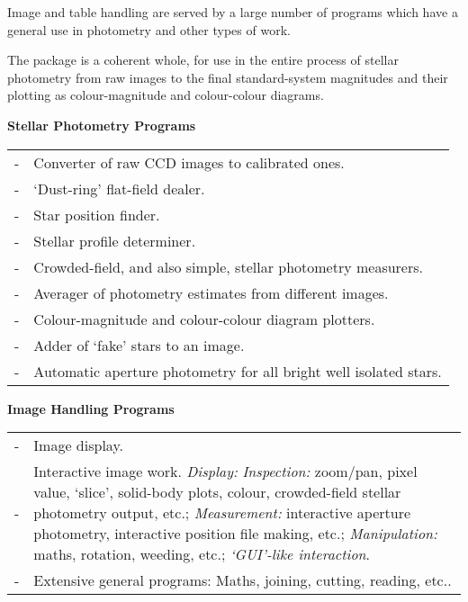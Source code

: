 Image and table handling are served by a large number of programs which have a
general use in photometry and other types of work.
 
The package is a coherent whole, for use in the entire process of stellar
photometry from raw images to the final standard-system magnitudes and
their plotting as colour-magnitude and colour-colour diagrams.
 
 
{\vspace*{1mm} \large \bf Stellar Photometry Programs \vspace*{-1mm} }
 
\hspace*{3ex} \begin{tabular}{lp{5.5in}}
- & Converter of raw CCD images to calibrated ones. \\
- & `Dust-ring' flat-field dealer. \\
- & Star position finder. \\
- & Stellar profile determiner. \\
- & Crowded-field, and also simple, stellar photometry measurers. \\
- & Averager of photometry estimates from different images. \\
- & Colour-magnitude and colour-colour diagram plotters. \\
- & Adder of `fake' stars to an image. \\
- & Automatic aperture photometry for all bright well isolated stars. \\
\end{tabular}
 
{\vspace*{1mm} \large \bf Image Handling Programs \vspace*{-1mm} }
 
\hspace*{3ex} \begin{tabular}{lp{5.5in}}
- & Image display. \\
- & Interactive image work. {\it Display:} {\it Inspection:}
    zoom/pan, pixel value, `slice', solid-body plots, colour, 
    crowded-field stellar photometry output, etc.;
    {\it Measurement:} interactive aperture photometry, interactive
    position file making, etc.; {\it Manipulation:} maths, rotation, 
    weeding, etc.; {\it `GUI'-like interaction}. \\
- & Extensive general programs: Maths, joining, cutting, reading, etc.. \\
\end{tabular}
 
